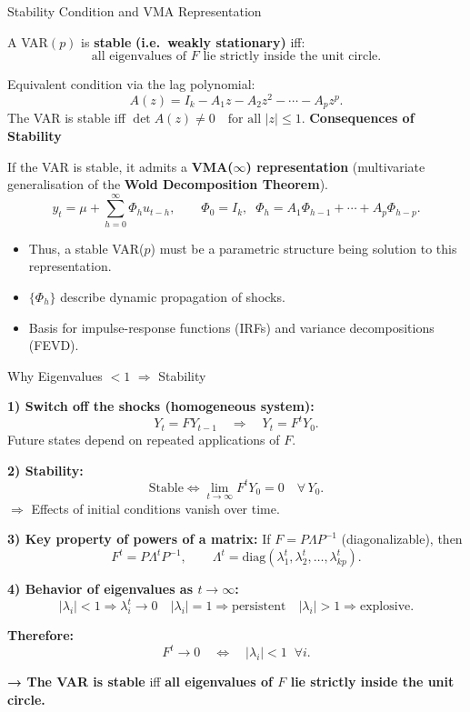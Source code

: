 \documentclass{beamer}
\begin{document}
\begin{frame}{Stability Condition and VMA Representation}
\small

A VAR$(p)$ is \textbf{stable} \textbf{(i.e.\ weakly stationary)} iff:
\[
\text{all eigenvalues of } F \text{ lie strictly inside the unit circle.}
\]

\medskip

Equivalent condition via the lag polynomial:
\[
A(z) = I_k - A_1 z - A_2 z^2 - \cdots - A_p z^p.
\]
The VAR is stable iff $\det A(z) \neq 0 \quad \text{for all } |z| \leq 1$.
\medskip
\pause
\textbf{Consequences of Stability}

If the VAR is stable, it admits a \textbf{VMA($\infty$) representation} (multivariate generalisation of the \textbf{Wold Decomposition Theorem}).
\[
y_t = \mu + \sum_{h=0}^{\infty} \Phi_h u_{t-h},
\qquad
\Phi_0 = I_k,\;\;
\Phi_h = A_1 \Phi_{h-1} + \cdots + A_p \Phi_{h-p}.
\]

\begin{itemize}
    \item  Thus, a stable VAR($p$) must be a parametric structure being solution to this representation.
    \item $\{\Phi_h\}$ describe dynamic propagation of shocks.
    \item Basis for impulse-response functions (IRFs) and variance decompositions (FEVD).
\end{itemize}
\end{frame}

\begin{frame}{Why Eigenvalues $<1$ $\Rightarrow$ Stability}
\small

\textbf{1) Switch off the shocks (homogeneous system):}
\[
Y_t = F Y_{t-1} \quad \Rightarrow \quad Y_t = F^t Y_0.
\]
Future states depend on repeated applications of $F$.

\medskip
\textbf{2) Stability:}
\[
\text{Stable} \iff \lim_{t\to\infty} F^t Y_0 = 0
\quad \forall\, Y_0.
\]
$\Rightarrow$ Effects of initial conditions vanish over time.

\medskip
\textbf{3) Key property of powers of a matrix:}
If $F = P \Lambda P^{-1}$ (diagonalizable), then
\[
F^t = P \Lambda^t P^{-1},
\qquad
\Lambda^t = \mathrm{diag}(\lambda_1^t,\lambda_2^t,\dots,\lambda_{kp}^t).
\]

\medskip
\textbf{4) Behavior of eigenvalues as $t\to\infty$:}
\[
|\lambda_i|<1 \Rightarrow \lambda_i^t\!\to 0
\quad
|\lambda_i|=1 \Rightarrow \text{persistent}
\quad
|\lambda_i|>1 \Rightarrow \text{explosive}.
\]

\medskip
\textbf{Therefore:}
\[
F^t \to 0
\quad \Leftrightarrow \quad
|\lambda_i|<1 \;\; \forall i.
\]

\textbf{→ The VAR is stable} iff \textbf{all eigenvalues of $F$ lie strictly inside the unit circle.}

\end{frame}
\end{document}
